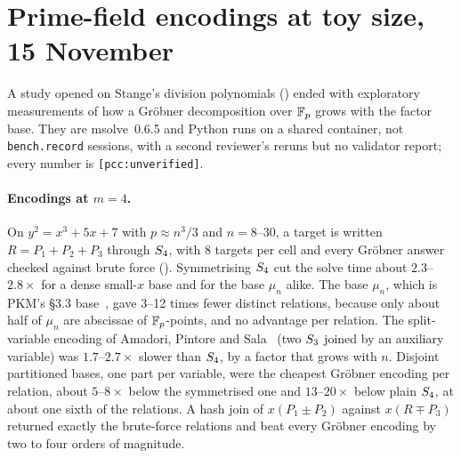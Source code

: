 \section{Prime-field encodings at toy size, 15 November}\label{sec:gb-toy15}

A study opened on Stange's division polynomials
() ended with exploratory
measurements of how a Gröbner decomposition over $\mathbb{F}_p$ grows with the
factor base. They are msolve~0.6.5 and Python runs on a shared container,
not \texttt{bench.record} sessions, with a second reviewer's reruns but no
validator report; every number is \texttt{[pcc:unverified]}.

\paragraph{Encodings at $m=4$.} On $y^2=x^3+5x+7$ with $p\approx n^3/3$ and
$n=8$--30, a target is written $R=P_1+P_2+P_3$ through $S_{4}$, with 8
targets per cell and every Gröbner answer checked against brute force
().
Symmetrising $S_{4}$ cut the solve time about $2.3$--$2.8\times$ for a dense
small-$x$ base and for the base $\mu_n$ alike. The base $\mu_n$, which is
PKM's \S3.3 base~\cite{pkm2016}, gave 3--12 times fewer distinct
relations, because only about half of $\mu_n$ are abscissae of
$\mathbb{F}_p$-points, and no advantage per relation. The split-variable encoding
of Amadori, Pintore and Sala~\cite{aps2018} (two $S_{3}$ joined by an
auxiliary variable) was $1.7$--$2.7\times$ slower than $S_{4}$, by a factor
that grows with $n$. Disjoint partitioned bases, one part per variable, were the cheapest
Gröbner encoding per relation, about $5$--$8\times$ below the symmetrised
one and $13$--$20\times$ below plain $S_{4}$, at about one sixth of the
relations. A hash join of $x(P_1\pm P_2)$ against $x(R\mp P_3)$ returned
exactly the brute-force relations and beat every Gröbner encoding by two
to four orders of magnitude.

